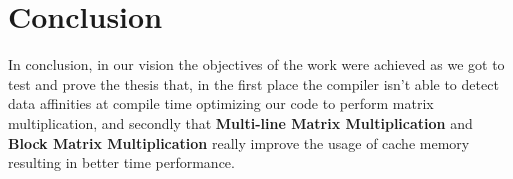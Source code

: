 \section{Conclusion}

In conclusion, in our vision the objectives of the work were achieved as we got to test and prove the thesis that, in the first place the compiler isn't able to detect data affinities at compile time optimizing our code to perform matrix multiplication, and secondly that \textbf{Multi-line Matrix Multiplication} and \textbf{Block Matrix Multiplication} really improve the usage of cache memory resulting in better time performance.